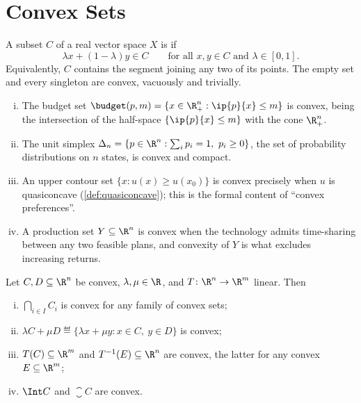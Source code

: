 \section{Convex Sets}\label{sec:cvx-sets}

\begin{definition}\label{def:convex-set}
	A subset $C$ of a real vector space $X$ is  if
	\[
		\lambda x+(1-\lambda)y\in C
		\qquad\text{for all }x,y\in C\text{ and }\lambda\in[0,1] .
	\]
	Equivalently, $C$ contains the segment joining any two of its points. The empty
	set and every singleton are convex, vacuously and trivially.
\end{definition}

\begin{eg}\label{eg:convex-sets}
	\begin{enumerate}[(i)]
		\item The budget set $\budget(p,m)=\{x\in\R^n_+:\ip{p}{x}\leq m\}$ is convex,
		      being the intersection of the half-space $\{\ip{p}{x}\leq m\}$ with the
		      cone $\R^n_+$.
		\item The unit simplex
		      $\Delta_n=\{p\in\R^n:\sum_ip_i=1,\ p_i\geq0\}$, the set of probability
		      distributions on $n$ states, is convex and compact.
		\item An upper contour set $\{x : u(x)\geq u(x_0)\}$ is convex precisely when
		      $u$ is quasiconcave (\autoref{def:quasiconcave}); this is the formal content
		      of ``convex preferences''.
		\item A production set $Y\subseteq\R^n$ is convex when the technology admits
		      time-sharing between any two feasible plans, and convexity of $Y$ is
		      what excludes increasing returns.
	\end{enumerate}
\end{eg}

\begin{proposition}\label{prop:convex-operations}
	Let $C,D\subseteq\R^n$ be convex, $\lambda,\mu\in\R$, and
	$T\colon\R^n\to\R^m$ linear. Then
	\begin{enumerate}[(i)]
		\item $\bigcap_{i\in I}C_i$ is convex for any family of convex sets;
		\item $\lambda C+\mu D\eqdef\{\lambda x+\mu y : x\in C,\ y\in D\}$ is convex;
		\item $T(C)\subseteq\R^m$ and $T^{-1}(E)\subseteq\R^n$ are convex, the latter
		      for any convex $E\subseteq\R^m$;
		\item $\Int C$ and $\closure C$ are convex.
	\end{enumerate}
\end{proposition}

